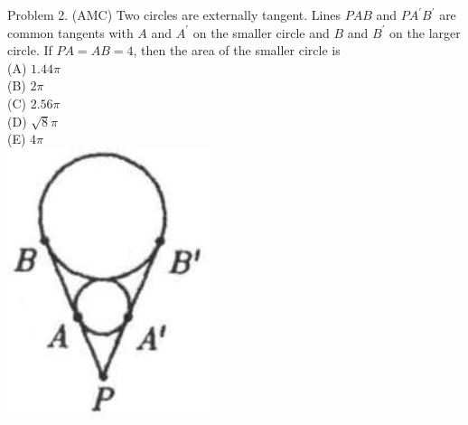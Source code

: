 \documentclass[10pt]{article}
\begin{document}
Problem 2. (AMC) Two circles are externally tangent. Lines \(P A B\) and \(P A^{\prime} B^{\prime}\) are common tangents with \(A\) and \(A^{\prime}\) on the smaller circle and \(B\) and \(B^{\prime}\) on the larger circle. If \(P A=A B=4\), then the area of the smaller circle is\\
(A) \(1.44 \pi\)\\
(B) \(2 \pi\)\\
(C) \(2.56 \pi\)\\
(D) \(\sqrt{8} \pi\)\\
(E) \(4 \pi\)\\
\includegraphics[max width=\textwidth, center]{2025_04_17_97bc1f7e44d93c271a88g-184(2)}
\end{document}
